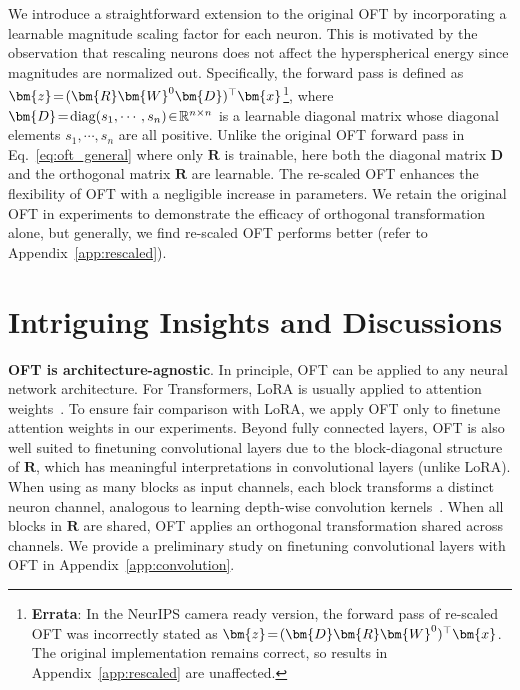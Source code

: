 We introduce a straightforward extension to the original OFT by incorporating a learnable magnitude scaling factor for each neuron. This is motivated by the observation that rescaling neurons does not affect the hyperspherical energy since magnitudes are normalized out. Specifically, the forward pass is defined as $\thickmuskip=2mu \medmuskip=2mu\bm{z}=(\bm{R}\bm{W}^0\bm{D})^\top\bm{x}$\footnote{\textbf{Errata}: In the NeurIPS camera ready version, the forward pass of re-scaled OFT was incorrectly stated as $\thickmuskip=2mu \medmuskip=2mu\bm{z}=(\bm{D}\bm{R}\bm{W}^0)^\top\bm{x}$. The original implementation remains correct, so results in Appendix~\ref{app:rescaled} are unaffected.}, where $\thickmuskip=2mu \medmuskip=2mu \bm{D}=\text{diag}(s_1,\cdots,s_n)\in\mathbb{R}^{n\times n}$ is a learnable diagonal matrix whose diagonal elements $s_1,\cdots,s_n$ are all positive. Unlike the original OFT forward pass in Eq.~\eqref{eq:oft_general} where only $\bm{R}$ is trainable, here both the diagonal matrix $\bm{D}$ and the orthogonal matrix $\bm{R}$ are learnable. The re-scaled OFT enhances the flexibility of OFT with a negligible increase in parameters. We retain the original OFT in experiments to demonstrate the efficacy of orthogonal transformation alone, but generally, we find re-scaled OFT performs better (refer to Appendix~\ref{app:rescaled}).

\section{Intriguing Insights and Discussions}

\textbf{OFT is architecture-agnostic}. In principle, OFT can be applied to any neural network architecture. For Transformers, LoRA is usually applied to attention weights~\cite{hulora2022}. To ensure fair comparison with LoRA, we apply OFT only to finetune attention weights in our experiments. Beyond fully connected layers, OFT is also well suited to finetuning convolutional layers due to the block-diagonal structure of $\bm{R}$, which has meaningful interpretations in convolutional layers (unlike LoRA). When using as many blocks as input channels, each block transforms a distinct neuron channel, analogous to learning depth-wise convolution kernels~\cite{chollet2017xception}. When all blocks in $\bm{R}$ are shared, OFT applies an orthogonal transformation shared across channels. We provide a preliminary study on finetuning convolutional layers with OFT in Appendix~\ref{app:convolution}.

